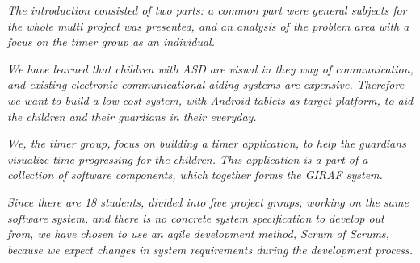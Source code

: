 \textit{The introduction consisted of two parts: a common part were general subjects for the whole multi project was presented, and an analysis of the problem area with a focus on the timer group as an individual.}

\textit{We have learned that children with ASD are visual in they way of communication, and existing electronic communicational aiding systems are expensive.
Therefore we want to build a low cost system, with Android tablets as target platform, to aid the children and their guardians in their everyday.}

\textit{We, the timer group, focus on building a timer application, to help the guardians visualize time progressing for the children.
This application is a part of a collection of software components, which together forms the GIRAF system.}

\textit{Since there are 18 students, divided into five project groups, working on the same software system, and there is no concrete system specification to develop out from, we have chosen to use an agile development method, Scrum of Scrums, because we expect changes in system requirements during the development process.}